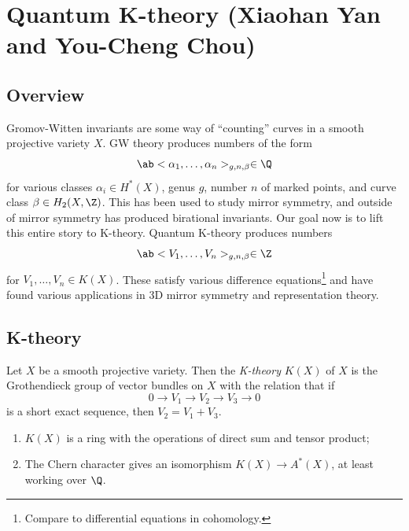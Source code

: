 \section{Quantum K-theory (Xiaohan Yan and You-Cheng Chou)}%
\label{sec:Quantum K-theory (Xiaohan Yan and You-Cheng Chou)}

\subsection{Overview}%
\label{sub:Overview}

Gromov-Witten invariants are some way of ``counting'' curves in a smooth projective variety \(X\). GW theory produces numbers of the form
\[ \ab<\alpha_1, \ldots, \alpha_n>_{g, n, \beta} \in \Q \]
for various classes \(\alpha_i \in H^*(X)\), genus \(g\), number \(n\) of marked points, and curve class \(\beta \in H_2(X, \Z)\). This has been used to study mirror symmetry, and outside of mirror symmetry has produced birational invariants. Our goal now is to lift this entire story to K-theory. Quantum K-theory produces numbers
\[ \ab<V_1, \ldots, V_n>_{g, n, \beta} \in \Z \]
for \(V_1, \ldots, V_n \in K(X)\). These satisfy various difference equations\footnote{Compare to differential equations in cohomology.} and have found various applications in 3D mirror symmetry and representation theory.

\subsection{K-theory}%
\label{sub:K-theory}

\begin{defn}
    Let \(X\) be a smooth projective variety. Then the \textit{K-theory} \(K(X)\) of \(X\) is the Grothendieck group of vector bundles on \(X\) with the relation that if
    \[ 0 \to V_1 \to V_2 \to V_3 \to 0 \]
    is a short exact sequence, then \(V_2 = V_1 + V_3\).
\end{defn}

\begin{rmk}\leavevmode
    \begin{enumerate}
        \item \(K(X)\) is a ring with the operations of direct sum and tensor product;
        \item The Chern character gives an isomorphism \(K(X) \to A^*(X)\), at least working over \(\Q\).
    \end{enumerate}
\end{rmk}

